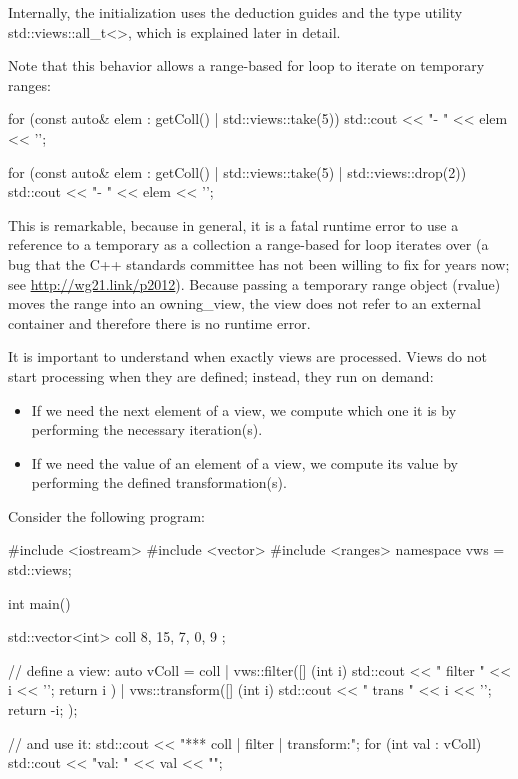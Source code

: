 Internally, the initialization uses the deduction guides and the type utility std::views::all\_t<>, which is explained later in detail.

Note that this behavior allows a range-based for loop to iterate on temporary ranges:

\begin{cpp}
for (const auto& elem : getColl() | std::views::take(5)) {
	std::cout << "- " << elem << '\n';
}

for (const auto& elem : getColl() | std::views::take(5) | std::views::drop(2)) {
	std::cout << "- " << elem << '\n';
}
\end{cpp}

This is remarkable, because in general, it is a fatal runtime error to use a reference to a temporary as a collection a range-based for loop iterates over (a bug that the C++ standards committee has not been willing to fix for years now; see \url{http://wg21.link/p2012}). Because passing a temporary range object (rvalue) moves the range into an owning\_view, the view does not refer to an external container and therefore there is no runtime error.


It is important to understand when exactly views are processed. Views do not start processing when they are defined; instead, they run on demand:

\begin{itemize}
\item
If we need the next element of a view, we compute which one it is by performing the necessary iteration(s).

\item
If we need the value of an element of a view, we compute its value by performing the defined transformation(s).
\end{itemize}

Consider the following program:


\begin{cpp}
#include <iostream>
#include <vector>
#include <ranges>
namespace vws = std::views;

int main()
{
	std::vector<int> coll{ 8, 15, 7, 0, 9 };
	
	// define a view:
	auto vColl = coll
				| vws::filter([] (int i) {
					std::cout << " filter " << i << '\n';
					return i %
				})
				| vws::transform([] (int i) {
					std::cout << " trans " << i << '\n';
					return -i;
				});
				
	// and use it:
	std::cout << "*** coll | filter | transform:\n";
	for (int val : vColl) {
		std::cout << "val: " << val << "\n\n";
	}
}
\end{cpp}

